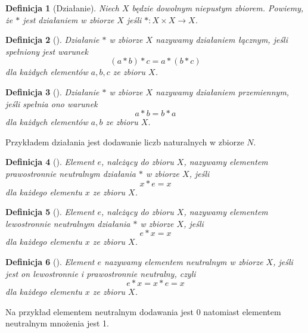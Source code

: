 \documentclass[12pt,a4paper]{report}
\newtheorem{definition}{Definicja}[chapter]
\begin{document}
\begin{definition}[Działanie]
Niech $X$ będzie dowolnym niepustym zbiorem. Powiemy, że $\ast$ jest działaniem w zbiorze $X$ jeśli $\ast: X \times X \to X$.
\end{definition}


\begin{definition}[\citep{jedrzejewski2011algebra}]
Działanie $\ast$ w zbiorze $X$ nazywamy działaniem łącznym, jeśli spełniony jest warunek 
\begin{equation*}
(a\ast b)\ast c = a\ast(b\ast c)
\end{equation*} 
dla każdych elementów $a,b,c$ ze zbioru $X$.
\end{definition}
\begin{definition}[\citep{jedrzejewski2011algebra}]
Działanie $\ast$ w zbiorze $X$ nazywamy działaniem przemiennym, jeśli spełnia ono warunek
\begin{equation*}
a\ast b=b\ast a
\end{equation*}
dla każdych elementów $a,b$ ze zbioru $X$.
\end{definition}
Przykładem działania jest dodawanie liczb naturalnych w zbiorze $N$.
\begin{definition}[\citep{jedrzejewski2011algebra}]
Element $e$, należący do zbioru $X$, nazywamy elementem prawostronnie neutralnym działania $\ast$ w zbiorze $X$, jeśli
\begin{equation*}
x\ast e = x
\end{equation*} 
dla każdego elementu $x$ ze zbioru $X$.
\end{definition}
\begin{definition}[\citep{jedrzejewski2011algebra}]
Element $e$, należący do zbioru $X$, nazywamy elementem lewostronnie neutralnym działania $\ast$ w zbiorze $X$, jeśli
\begin{equation*}
e\ast x = x
\end{equation*} 
dla każdego elementu $x$ ze zbioru $X$.
\end{definition}
\begin{definition}[\citep{jedrzejewski2011algebra}]
Element $e$ nazywamy elementem neutralnym w zbiorze $X$, jeśli jest on lewostronnie i prawostronnie neutralny, czyli
\begin{equation*}
e\ast x = x\ast e = x
\end{equation*}
dla każdego elementu $x$ ze zbioru $X$.
\end{definition}
Na przykład elementem neutralnym dodawania jest 0 natomiast elementem neutralnym mnożenia jest 1.
\end{document}
